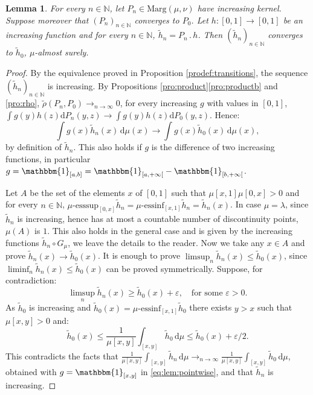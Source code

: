 \documentclass[JEP,XML,SOM,Unicode,NoEqCountersInSection,NoFloatCountersInSection,published]{cedram}
\newcommand{\ldot}{\mathbin{.}}
\theoremstyle{plain}
\newtheorem{lem}[them]{Lemma}
\theoremstyle{definition}
\newcommand{\dd}{\mathrm{d}}
\newcommand{\one}{\mathbbm{1}}
\let\eps\varepsilon
\newcommand{\la}{\lambda}
\newcommand{\ma}{\mathrm{Marg}}
\newcommand{\N}{\mathbb{N}}
\newcommand{\clo}{\mathclose}
\begin{document}
\begin{lem}\label{lem:pointwise}
For every $n\in \N$, let $P_n\in \ma(\mu,\nu)$ have increasing kernel. Suppose moreover that $(P_n)_{n\in\N}$ converges to $P_0$. Let $h:[0,1]\to [0,1]$ be an increasing function and for every $n\in \N$, $\tilde{h}_n=P_{n}{}\ldot h$. Then $(\tilde h_n)_{n\in\N}$ converges to $\tilde h_0$, $\mu$-almost surely.
\end{lem}
\begin{proof}By the equivalence proved in Proposition \ref{prodef:transitions}, the sequence $(\tilde h_n)_{n\in \N}$ is increasing. By Propositions \ref{pro:product}\eqref{pro:productb} and \ref{pro:rho}, $\tilde{\rho}(P_n,P_0)\to_{n\to\infty} 0$, \ie for every increasing $g$ with values in $[0,1]$, $\int g(y)h(z) \dd P_n(y,z)\to \int g(y)h(z)\dd P_0(y,z)$. Hence:\vspace*{-3pt}%
\begin{equation}\label{eq:lem:pointwise}
\int g(x)\tilde{h}_n(x)\,\dd \mu(x)\to \int g(x)\tilde{h}_0(x)\,\dd \mu(x),
\end{equation}
by definition of $\tilde h_n$. This also holds if $g$ is the difference of two increasing functions, in particular $g=\one_{[a,b]}=\one_{[a,+\infty\clo[}-\one_{[b,+\infty\clo[}$.

Let $A$ be the set of the elements $x$ of $[0,1]$ such that $\mu[x,1]\mu[0,x]>0$ and for every $n\in \N$, $\mu\text{-}\mathrm{esssup}_{[0,x]}\tilde{h}_n=\mu\text{-}\mathrm{essinf}_{[x,1]}\tilde{h}_n=\tilde{h}_n(x)$. In case $\mu=\la$, since $\tilde h_n$ is increasing, hence has at most a countable number of discontinuity points, $\mu(A)$ is $1$. This also holds in the general case and is given by the increasing functions $\tilde{h}_n\circ G_\mu$, we leave the details to the reader. Now we take any $x\in A$ and prove $\tilde h_n(x)\to\tilde h_0(x)$. It is enough to prove $\limsup_{n}\tilde{h}_n(x)\leq \tilde{h}_0(x)$, since $\liminf_{n}\tilde{h}_n(x)\leq \tilde{h}_0(x)$ can be proved symmetrically. Suppose, for contradiction:\vspace*{-3pt}
\[\limsup_{n}\tilde{h}_n(x)\geq \tilde{h}_0(x)+\eps,\quad \text{for some $\eps>0$.}\]
As $\tilde{h}_{0}$ is increasing and $\tilde{h}_0(x)=\mu\text{-}\mathrm{essinf}_{[x,1]}\tilde{h}_0$ there exists $y>x$ such that $\mu[x,y]>0$ and:\vspace*{-3pt}
\[\tilde{h}_0(x)\leq\frac1{\mu[x,y]} \int_{[x,y]}\tilde{h}_0\,\dd\mu\leq \tilde{h}_0(x)+\eps/2.\]
This contradicts the facts that $\frac1{\mu[x,y]} \int_{[x,y]}\tilde{h}_n\,\dd\mu\to_{n\to\infty}\frac1{\mu[x,y]} \int_{[x,y]}\tilde{h}_0\,\dd\mu$, obtained with $g=\one_{[x,y]}$ in \eqref{eq:lem:pointwise}, and that $\tilde h_n$ is increasing.
\end{proof}
\end{document}
